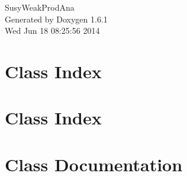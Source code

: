 \documentclass[a4paper]{book}
\begin{document}
\hypersetup{pageanchor=false}
\begin{titlepage}
\vspace*{7cm}
\begin{center}
{\Large SusyWeakProdAna }\\
\vspace*{1cm}
{\large Generated by Doxygen 1.6.1}\\
\vspace*{0.5cm}
{\small Wed Jun 18 08:25:56 2014}\\
\end{center}
\end{titlepage}
\clearemptydoublepage
{}
\tableofcontents
\clearemptydoublepage
{}
\hypersetup{pageanchor=true}
\chapter{Class Index}

\chapter{Class Index}

\chapter{Class Documentation}





















\printindex
\end{document}
